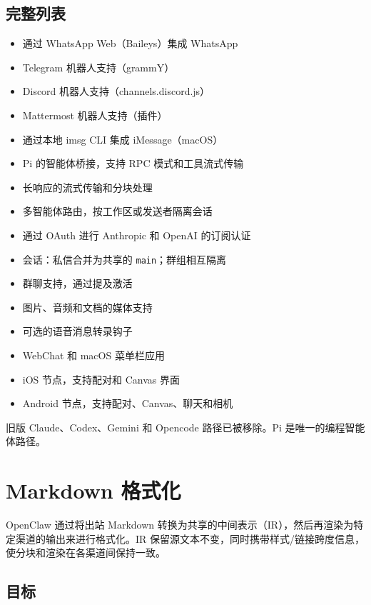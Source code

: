 \subsection{完整列表}


\begin{itemize}
  \item 通过 WhatsApp Web（Baileys）集成 WhatsApp
  \item Telegram 机器人支持（grammY）
  \item Discord 机器人支持（channels.discord.js）
  \item Mattermost 机器人支持（插件）
  \item 通过本地 imsg CLI 集成 iMessage（macOS）
  \item Pi 的智能体桥接，支持 RPC 模式和工具流式传输
  \item 长响应的流式传输和分块处理
  \item 多智能体路由，按工作区或发送者隔离会话
  \item 通过 OAuth 进行 Anthropic 和 OpenAI 的订阅认证
  \item 会话：私信合并为共享的 \texttt{main}；群组相互隔离
  \item 群聊支持，通过提及激活
  \item 图片、音频和文档的媒体支持
  \item 可选的语音消息转录钩子
  \item WebChat 和 macOS 菜单栏应用
  \item iOS 节点，支持配对和 Canvas 界面
  \item Android 节点，支持配对、Canvas、聊天和相机
\end{itemize}


旧版 Claude、Codex、Gemini 和 Opencode 路径已被移除。Pi 是唯一的编程智能体路径。


\clearpage

\section{Markdown 格式化}


OpenClaw 通过将出站 Markdown 转换为共享的中间表示（IR），然后再渲染为特定渠道的输出来进行格式化。IR 保留源文本不变，同时携带样式/链接跨度信息，使分块和渲染在各渠道间保持一致。

\subsection{目标}


